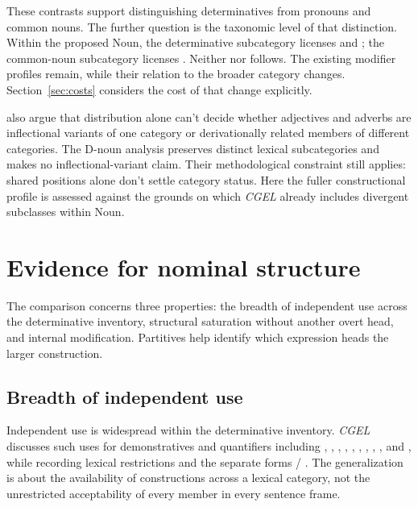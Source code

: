 \documentclass[12pt]{article}
\begin{document}
These contrasts support distinguishing determinatives from pronouns and common nouns. The further question is the taxonomic level of that distinction. Within the proposed Noun, the determinative subcategory licenses  and ; the common-noun subcategory licenses . Neither  nor  follows. The existing modifier profiles remain, while their relation to the broader category changes. Section~\ref{sec:costs} considers the cost of that change explicitly.

\textcite[60--61]{payne2010} also argue that distribution alone can't decide whether adjectives and adverbs are inflectional variants of one category or derivationally related members of different categories. The D-noun analysis preserves distinct lexical subcategories and makes no inflectional-variant claim. Their methodological constraint still applies: shared positions alone don't settle category status. Here the fuller constructional profile is assessed against the grounds on which \textit{CGEL} already includes divergent subclasses within Noun.

\section{Evidence for nominal structure}\label{sec:evidence}

The comparison concerns three properties: the breadth of independent use across the determinative inventory, structural saturation without another overt head, and internal modification. Partitives help identify which expression heads the larger construction.

\subsection{Breadth of independent use}

Independent use is widespread within the determinative inventory. \textit{CGEL} discusses such uses for demonstratives and quantifiers including , , , , , , , , ,  and , while recording lexical restrictions and the separate forms / \citep[371--372, 410--424]{huddleston2002}. The generalization is about the availability of constructions across a lexical category, not the unrestricted acceptability of every member in every sentence frame.
\end{document}
